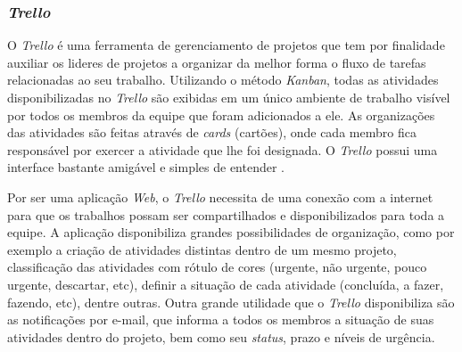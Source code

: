 \subsubsection{\textit{Trello}}

O \textit{Trello} é uma ferramenta de gerenciamento de projetos que tem por finalidade auxiliar os lideres de projetos a organizar da melhor forma o fluxo de tarefas relacionadas ao seu trabalho. Utilizando o método \textit{Kanban}, todas as atividades disponibilizadas no \textit{Trello} são exibidas em um único ambiente de trabalho visível por todos os membros da equipe que foram adicionados a ele. As organizações das atividades são feitas através de \textit{cards} (cartões), onde cada membro fica responsável por exercer a atividade que lhe foi designada. O \textit{Trello } possui uma interface bastante amigável e simples de entender \cite{TRELLO2017}. 

Por ser uma aplicação \textit{Web}, o \textit{Trello} necessita de uma conexão com a internet para que os trabalhos possam ser compartilhados e disponibilizados para toda a equipe. A aplicação disponibiliza grandes possibilidades de organização, como por exemplo a criação de atividades distintas dentro de um mesmo projeto, classificação das atividades com rótulo de cores (urgente, não urgente, pouco urgente, descartar, etc), definir a situação de cada atividade (concluída, a fazer, fazendo, etc), dentre outras. Outra grande utilidade que o \textit{Trello} disponibiliza são as notificações por e-mail, que informa a todos os membros a situação de suas atividades dentro do projeto, bem como seu \textit{status}, prazo e níveis de urgência.